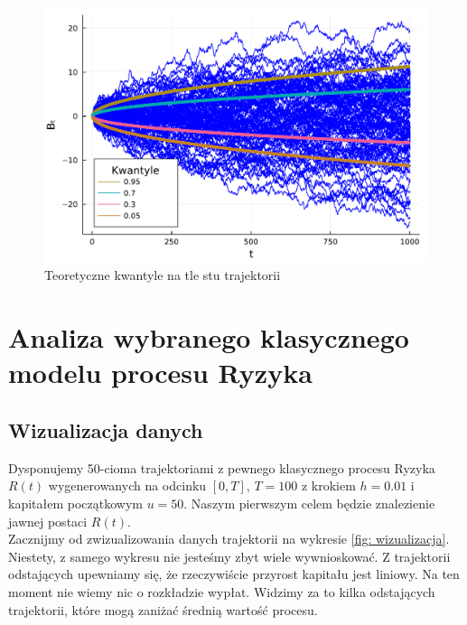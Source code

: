 \documentclass{article}
\theoremstyle{break}
\numberwithin{equation}{subsection}
\numberwithin{figure}{section}
\begin{document}
\begin{figure}[H]
	\center
	\includegraphics[scale=0.35]{kwantyle.pdf}
	\caption{Teoretyczne kwantyle na tle stu trajektorii}
	\label{fig: wiązka_browna}
\end{figure}



\section{Analiza wybranego klasycznego modelu procesu Ryzyka}


\subsection{Wizualizacja danych}

Dysponujemy 50-cioma trajektoriami z pewnego klasycznego procesu Ryzyka $R(t)$ wygenerowanych na odcinku $[0,T]$, $T= 100$ z krokiem $h = 0.01$ i kapitałem początkowym $u=50$. Naszym pierwszym celem będzie znalezienie jawnej postaci $R(t)$.\\
Zacznijmy od zwizualizowania danych trajektorii na wykresie \ref{fig: wizualizacja}. Niestety, z samego wykresu nie jesteśmy zbyt wiele wywnioskować. Z trajektorii odstających upewniamy się, że rzeczywiście przyrost kapitału jest liniowy. Na ten moment nie wiemy nic o rozkładzie wypłat.
Widzimy za to kilka odstających trajektorii, które mogą zaniżać średnią wartość procesu.
\end{document}
